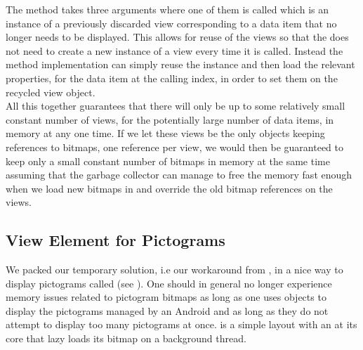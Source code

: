 The  method takes three arguments where one of them is called  which is an instance of a previously discarded view corresponding to a data item that no longer needs to be displayed. This allows for reuse of the views so that the  does not need to create a new instance of a view every time it is called. Instead the  method implementation can simply reuse the  instance and then load the relevant properties, for the data item at the calling index, in order to set them on the recycled view object. \\

All this together guarantees that there will only be up to some relatively small constant number of views, for the potentially large number of data items, in memory at any one time. If we let these views be the only objects keeping references to bitmaps, one reference per view, we would then be guaranteed to keep only a small constant number of bitmaps in memory at the same time assuming that the garbage collector can manage to free the memory fast enough when we load new bitmaps in and override the old bitmap references on the views. 

\subsection{View Element for Pictograms}
We packed our temporary solution, i.e our workaround from , in a nice way to display pictograms called  (see ). One should in general no longer experience memory issues related to pictogram bitmaps as long as one uses  objects to display the pictograms managed by an Android  and as long as they do not attempt to display too many pictograms at once.  is a simple layout with an  at its core that lazy loads its bitmap on a background thread.